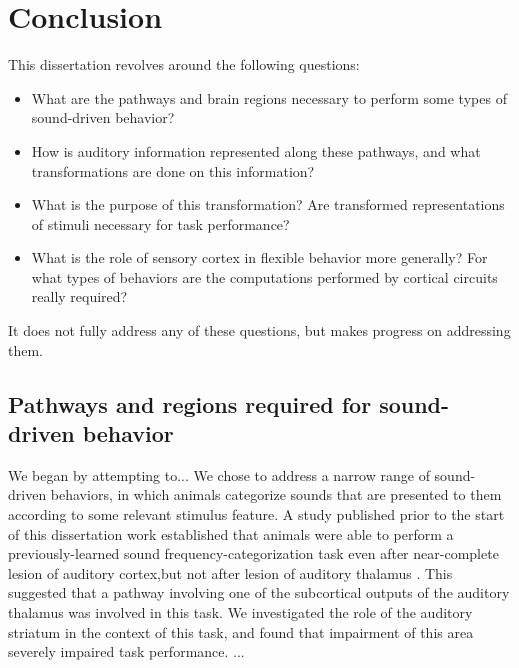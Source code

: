 \chapter{Conclusion}

This dissertation revolves around the following questions: 
\begin{itemize}
\item What are the pathways and brain regions necessary to perform some types of sound-driven behavior? 
\item How is auditory information represented along these pathways, and what transformations are done on this information?
\item What is the purpose of this transformation? Are transformed representations of stimuli necessary for task performance? 
\item What is the role of sensory cortex in flexible behavior more generally? For what types of behaviors are the computations performed by cortical circuits really required?
\end{itemize}

It does not fully address any of these questions, but makes progress on addressing them.

\section{Pathways and regions required for sound-driven behavior}
We began by attempting to...
%
We chose to address a narrow range of sound-driven behaviors, in which animals categorize sounds that are presented to them according to some relevant stimulus feature.
%
A study published prior to the start of this dissertation work established that animals were able to perform a previously-learned sound frequency-categorization task even after near-complete lesion of auditory cortex,but not after lesion of auditory thalamus \citep{Gimenez2015}.
%
This suggested that a pathway involving one of the subcortical outputs of the auditory thalamus was involved in this task.
%
We investigated the role of the auditory striatum in the context of this task, and found that impairment of this area severely impaired task performance. 
%
...

